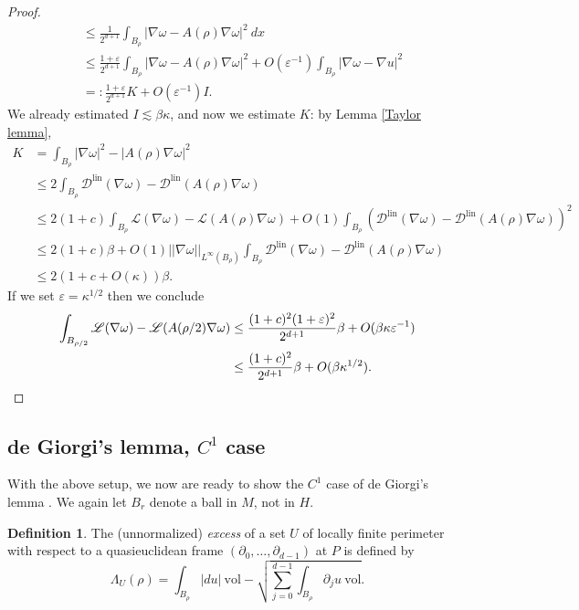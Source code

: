 \documentclass[reqno,12pt,letterpaper]{amsart}
\newcommand{\Lagrange}{\mathscr L}
\newcommand{\DirL}{\mathscr D^{\mathrm{lin}}}
\newcommand{\vol}{\mathrm{vol}}
\newcommand{\dfn}[1]{\emph{#1}\index{#1}}
\theoremstyle{definition}
\newtheorem{definition}[theorem]{Definition}
\numberwithin{equation}{section}
\begin{document}
\begin{proof}
\begin{align*}
&\leq \frac{1}{2^{d + 1}} \int_{B_\rho} |\nabla \omega - A(\rho)\nabla \omega|^2 ~dx \\
&\leq \frac{1 + \varepsilon}{2^{d + 1}} \int_{B_\rho} |\nabla \omega - A(\rho)\nabla \omega|^2  + O(\varepsilon^{-1})\int_{B_\rho} |\nabla \omega - \nabla u|^2\\
&=: \frac{1 + \varepsilon}{2^{d + 1}}K + O(\varepsilon^{-1})I.
\end{align*}
We already estimated $I \lesssim \beta \kappa$, and now we estimate $K$: by Lemma \ref{Taylor lemma},
\begin{align*}
K &= \int_{B_\rho} |\nabla \omega|^2 - |A(\rho)\nabla \omega|^2\\
&\leq 2\int_{B_\rho} \DirL(\nabla \omega) - \DirL(A(\rho)\nabla \omega)\\
&\leq 2(1 + c)\int_{B_\rho} \Lagrange(\nabla \omega) - \Lagrange(A(\rho)\nabla\omega) + O(1) \int_{B_\rho} (\DirL(\nabla \omega) - \DirL(A(\rho)\nabla \omega))^2\\
&\leq 2(1 + c)\beta + O(1) ||\nabla \omega||_{L^\infty(B_\rho)} \int_{B_\rho} \DirL(\nabla \omega) - \DirL(A(\rho)\nabla \omega) \\
&\leq 2(1 + c + O(\kappa))\beta.
\end{align*}
If we set $\varepsilon = \kappa^{1/2}$ then we conclude
\begin{align*}
\int_{B_{\rho/2}} \Lagrange(\nabla \omega) - \Lagrange(A(\rho/2)\nabla \omega)
&\leq \frac{(1 + c)^2(1 + \varepsilon)^2}{2^{d + 1}}\beta + O(\beta \kappa \varepsilon^{-1})\\
&\leq \frac{(1 + c)^2}{2^{d + 1}}\beta + O(\beta \kappa^{1/2}). \qedhere
\end{align*}
\end{proof}

\subsection{de Giorgi's lemma, $C^1$ case}
With the above setup, we now are ready to show the $C^1$ case of de Giorgi's lemma \cite[Teorema 4.4]{Miranda66}.
We again let $B_r$ denote a ball in $M$, not in $H$.

\begin{definition}
The (unnormalized) \dfn{excess} of a set $U$ of locally finite perimeter with respect to a quasieuclidean frame $(\partial_0, \dots, \partial_{d - 1})$ at $P$ is defined by
$$\Lambda_U(\rho) = \int_{B_\rho} |du| ~\vol - \sqrt{\sum_{j=0}^{d - 1} \int_{B_\rho} \partial_ju ~\vol}.$$
\end{definition}
\end{document}
